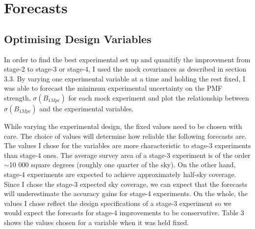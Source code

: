 \section{Forecasts}

\subsection{Optimising Design Variables}

In order to find the best experimental set up and quanitify the improvement from stage-2 to stage-3 or stage-4, I used the mock covariances as described in section 3.3. By varying one experimental variable at a time and holding the rest fixed, I was able to forecast the minimum experimental uncertainty on the PMF strength, $\sigma(B_{1Mpc})$ for each mock experiment and plot the relationship between $\sigma(B_{1Mpc})$ and the experimental variables.

While varying the experimental design, the fixed values need to be chosen with care. The choice of values will determine how reliable the following forecasts are. The values I chose for the variables are more characteristic to stage-3 experiments than stage-4 ones. The average survey area of a stage-3 experiment is of the order $\sim$10 000 square degrees (roughly one quarter of the sky). On the other hand, stage-4 experiments are expected to achieve approximately half-sky coverage. Since I chose the stage-3 expected sky coverage, we can expect that the forecasts will underestimate the accuracy gains for stage-4 experiments. On the whole, the values I chose reflect the design specifications of a stage-3 experiment so we would expect the forecasts for stage-4 improvements to be conservative. Table 3 shows the values chosen for a variable when it was held fixed.

